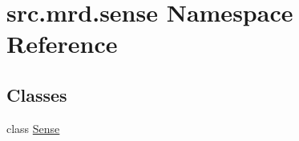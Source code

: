\hypertarget{namespacesrc_1_1mrd_1_1sense}{\section{src.\+mrd.\+sense Namespace Reference}
\label{namespacesrc_1_1mrd_1_1sense}
}
\subsection*{Classes}
\begin{DoxyCompactItemize}
\item 
class \hyperlink{classsrc_1_1mrd_1_1sense_1_1_sense}{Sense}
\end{DoxyCompactItemize}
